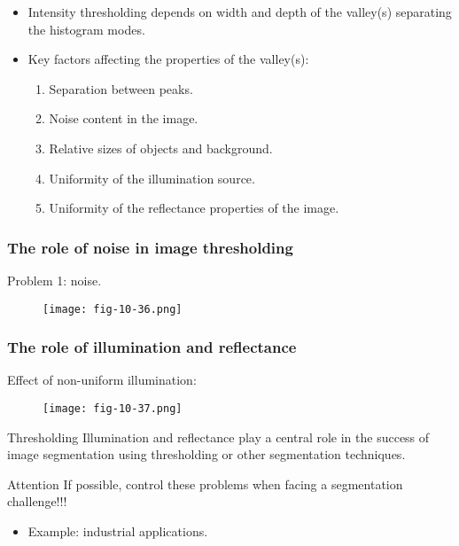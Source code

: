 \begin{frame}
\begin{itemize}
\item Intensity thresholding depends on width and depth of the valley(s) separating the histogram modes.
\item Key factors affecting the properties of the valley(s):
\begin{enumerate}
\item Separation between peaks.
\item Noise content in the image.
\item Relative sizes of objects and background.
\item Uniformity of the illumination source.
\item Uniformity of the reflectance properties of the image.
\end{enumerate}
\end{itemize}
\end{frame}

\subsubsection{The role of noise in image thresholding}

\begin{frame}
Problem 1: noise.
\begin{figure}[!h]
\texttt{[image: fig-10-36.png]}
\end{figure}
\end{frame}

\subsubsection{The role of illumination and reflectance}

\begin{frame}
Effect of non-uniform illumination:
\begin{figure}[!h]
\texttt{[image: fig-10-37.png]}
\end{figure}
\end{frame}

\begin{frame}
\begin{block}{Thresholding}
Illumination and reflectance play a central role in the success of image segmentation using thresholding or other segmentation techniques.
\end{block}
\begin{block}{Attention}
If possible, control these problems when facing a segmentation challenge!!!
\end{block}
\begin{itemize}
\item Example: industrial applications.
\end{itemize}
\end{frame}


